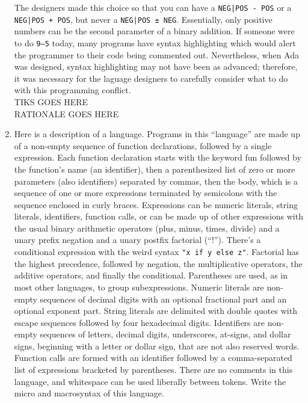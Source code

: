 \documentclass{article}
\begin{document}
\begin{enumerate}
    The designers made this choice so that you can have a \texttt{NEG|POS - POS} or a \texttt{NEG|POS + POS}, but never a \texttt{NEG|POS ± NEG}. Essentially, only positive numbers can be the second parameter of a binary addition. If someone were to do \texttt{9--5} today, many programs have syntax highlighting which would alert the programmer to their code being commented out. Nevertheless, when Ada was designed, syntax highlighting may not have been as advanced; therefore, it was necessary for the laguage designers to carefully consider what to do with this programming conflict. \\
    TIKS GOES HERE \\
    RATIONALE GOES HERE \\
    \pagebreak
    \item Here is a description of a language. Programs in this ``language'' are made up of a non-empty sequence of function declarations, followed by a single expression. Each function declaration starts with the keyword fun followed by the function's name (an identifier), then a parenthesized list of zero or more parameters (also identifiers) separated by commas, then the body, which is a sequence of one or more expressions terminated by semicolons with the sequence enclosed in curly braces. Expressions can be numeric literals, string literals, identifiers, function calls, or can be made up of other expressions with the usual binary arithmetic operators (plus, minus, times, divide) and a unary prefix negation and a unary postfix factorial (``!''). There's a conditional expression with the weird syntax \texttt{"x if y else z"}. Factorial has the highest precedence, followed by negation, the multiplicative operators, the additive operators, and finally the conditional. Parentheses are used, as in most other languages, to group subexpressions. Numeric literals are non-empty sequences of decimal digits with an optional fractional part and an optional exponent part. 
    String literals are delimited with double quotes with escape sequences followed by four hexadecimal digits. Identifiers are non-empty sequences of letters, decimal digits, underscores, at-signs, and dollar signs, beginning with a letter or dollar sign, that are not also reserved words. Function calls are formed with an identifier followed by a comma-separated list of expressions bracketed by parentheses. There are no comments in this language, and whitespace can be used liberally between tokens.
    Write the micro and macrosyntax of this language.
    

\end{enumerate}
\end{document}
